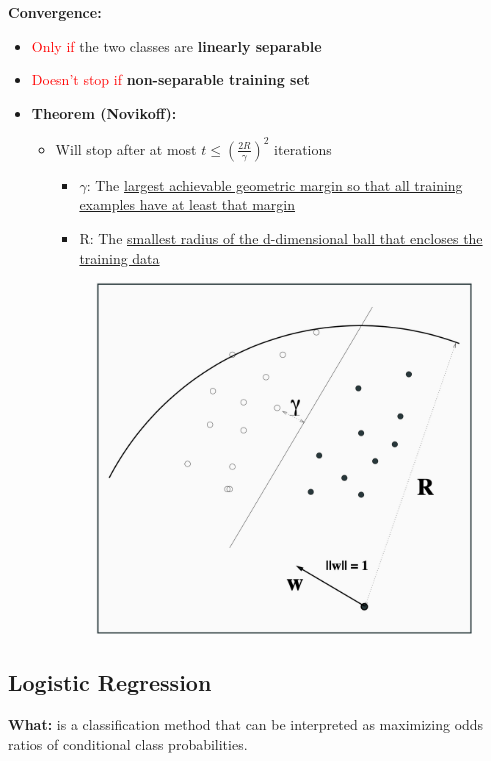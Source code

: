 \documentclass[12pt, a4paper]{article}
\begin{document}
\textbf{Convergence:}
\begin{itemize}
  \item \textcolor{red}{Only if} the two classes are \textbf{linearly separable}
  \item \textcolor{red}{Doesn't stop if} \textbf{non-separable training set}
  \item \textbf{Theorem (Novikoff):}
  \begin{itemize}
    \item Will stop after at most $t \leq (\frac{2R}{\gamma})^2$ iterations
    \begin{itemize}
      \item $\gamma$: The \uline{largest achievable geometric margin so that all training examples have at least that margin}
      \item R: The \uline{smallest radius of the d-dimensional ball that encloses the training data}
    \end{itemize}
    \begin{figure}[H]
      \centering  %
        \includegraphics[width=0.6\columnwidth]{images/perceptron-convergence.png}
        \label{fig:perceptron-convergence}
    \end{figure}
  \end{itemize}
\end{itemize}







\subsection{Logistic Regression}\label{logistic-regression}

\textbf{What:} is a classification method that can be interpreted as maximizing odds ratios of conditional class probabilities.
\end{document}
